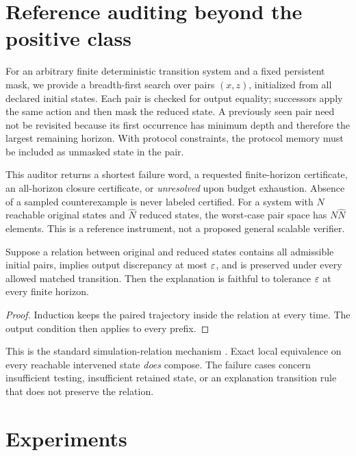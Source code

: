 \section{Reference auditing beyond the positive class}
For an arbitrary finite deterministic transition system and a fixed persistent mask, we provide a breadth-first search over pairs $(x,z)$, initialized from all declared initial states. Each pair is checked for output equality; successors apply the same action and then mask the reduced state. A previously seen pair need not be revisited because its first occurrence has minimum depth and therefore the largest remaining horizon. With protocol constraints, the protocol memory must be included as unmasked state in the pair.

This auditor returns a shortest failure word, a requested finite-horizon certificate, an all-horizon closure certificate, or \emph{unresolved} upon budget exhaustion. Absence of a sampled counterexample is never labeled certified. For a system with $N$ reachable original states and $\hat N$ reduced states, the worst-case pair space has $N\hat N$ elements. This is a reference instrument, not a proposed general scalable verifier.

\begin{proposition}\label{prop:closure}
Suppose a relation between original and reduced states contains all admissible initial pairs, implies output discrepancy at most $\varepsilon$, and is preserved under every allowed matched transition. Then the explanation is faithful to tolerance $\varepsilon$ at every finite horizon.
\end{proposition}
\begin{proof}
Induction keeps the paired trajectory inside the relation at every time. The output condition then applies to every prefix.
\end{proof}
This is the standard simulation-relation mechanism \citep{girard2011}. Exact local equivalence on every reachable intervened state \emph{does} compose. The failure cases concern insufficient testing, insufficient retained state, or an explanation transition rule that does not preserve the relation.

\section{Experiments}
